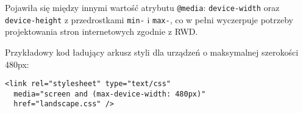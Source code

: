Pojawiła się między innymi wartość atrybutu \lstinline{@media}: \lstinline{device-width} oraz \lstinline{device-height} z przedrostkami \lstinline{min-} i \lstinline{max-}, co w pełni wyczerpuje potrzeby projektowania stron internetowych zgodnie z RWD.

Przykładowy kod ładujący arkusz styli dla urządzeń o maksymalnej szerokości 480px:

\lstset{language=Octave}
\begin{lstlisting}
<link rel="stylesheet" type="text/css"
  media="screen and (max-device-width: 480px)"
  href="landscape.css" />
\end{lstlisting}
